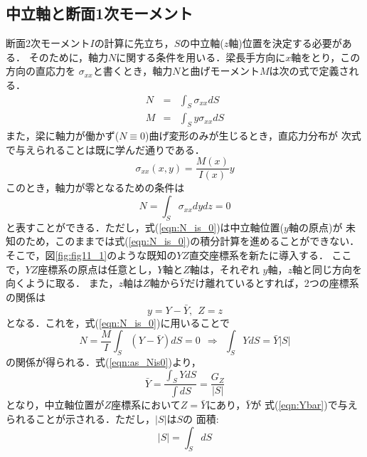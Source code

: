 \documentclass[10pt,a4j]{jbook}
\begin{document}
\subsection{中立軸と断面1次モーメント}
断面2次モーメント$I$の計算に先立ち，$S$の中立軸($z$軸)位置を決定する必要がある．
そのために，軸力$N$に関する条件を用いる．梁長手方向に$x$軸をとり，この方向の直応力を
$\sigma_{xx}$と書くとき，軸力$N$と曲げモーメント$M$は次の式で定義される．
\begin{eqnarray}
	N &= & \int_S \sigma_{xx}dS 
	\label{eqn:def_N}
	\\
	M &= & \int_S y\sigma_{xx}dS 
	\label{eqn:def_M}
\end{eqnarray}
また，梁に軸力が働かず($N\equiv 0$)曲げ変形のみが生じるとき，直応力分布が
次式で与えられることは既に学んだ通りである．
\begin{equation}
	\sigma_{xx}(x,y)=\frac{M(x)}{I(x)}y
	\label{eqn:sig_xx}
\end{equation}
このとき，軸力が零となるための条件は
\begin{equation}
	N =  \int_S \sigma_{xx}dydz = 0 
	\label{eqn:N_is_0}
\end{equation}
と表すことができる．ただし，式(\ref{eqn:N_is_0})は中立軸位置($y$軸の原点)が
未知のため，このままでは式(\ref{eqn:N_is_0})の積分計算を進めることができない．
そこで，図\ref{fig:fig11_1}のような既知の$YZ$直交座標系を新たに導入する．
ここで，$YZ$座標系の原点は任意とし，$Y$軸と$Z$軸は，それぞれ
$y$軸，$z$軸と同じ方向を向くように取る．
また，$z$軸は$Z$軸から$\bar{Y}$だけ離れているとすれば，2つの座標系の関係は
\begin{equation}
	y=Y-\bar Y, \ \ Z=z
	\label{eqn:y_shift}
\end{equation}
となる．これを，式(\ref{eqn:N_is_0})に用いることで
\begin{equation}
	N=\frac{M}{I}\int_S \left(Y-\bar Y \right)dS=0 
	\ \ \Rightarrow \ \
	\int_S Y dS =\bar Y \left| S \right|
	\label{eqn:as_Nis0}
\end{equation}
の関係が得られる．式(\ref{eqn:as_Nis0})より，
\begin{equation}
	\bar Y
	= \frac{\int_S YdS }{\int dS}
	= \frac{G_Z}{\left| S \right|}
	\label{eqn:Ybar}
\end{equation}
となり，中立軸位置が$Z$座標系において$Z=\bar{Y}$にあり，$\bar{Y}$が
式(\ref{eqn:Ybar})で与えられることが示される．ただし，$\left| S\right|$は$S$の
面積:
\begin{equation}
	\left| S \right| = \int_S dS
	\label{eqn:area}
\end{equation}
\end{document}
